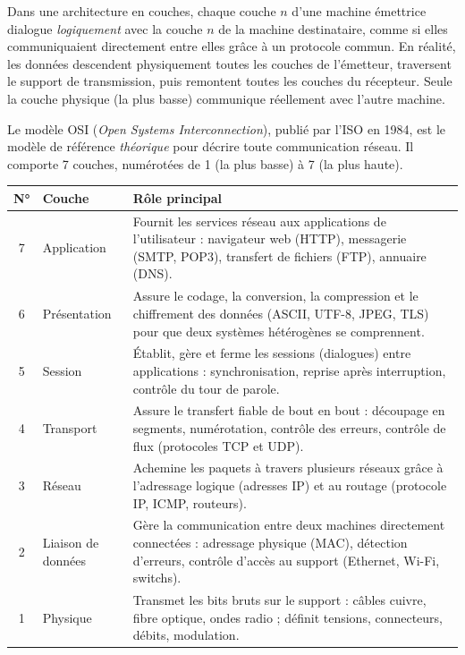 \documentclass[11pt]{article}
\newcommand{\cle}[1]{{\popxbold\color{popdark}#1}}
\newcounter{popsec}
\newcounter{popsub}
\newcommand{\courssub}[1]{%
  \stepcounter{popsub}%
  \par\vspace{9pt}\noindent{\popxbold\fontsize{11.5}{13}\selectfont\color{popink}{\color{poporange}\thepopsec.\thepopsub}\hspace{6pt}#1}\par\nopagebreak\vspace{4pt}
}
\begin{document}
\begin{propriete}
Dans une architecture en couches, chaque couche $n$ d'une machine émettrice dialogue \emph{logiquement} avec la couche $n$ de la machine destinataire, comme si elles communiquaient directement entre elles grâce à un protocole commun. En réalité, les données descendent physiquement toutes les couches de l'émetteur, traversent le support de transmission, puis remontent toutes les couches du récepteur. Seule la couche physique (la plus basse) communique réellement avec l'autre machine.
\end{propriete}

\courssub{Le modèle OSI : les 7 couches}

Le modèle \cle{OSI} (\emph{Open Systems Interconnection}), publié par l'\cle{ISO} en 1984, est le modèle de référence \emph{théorique} pour décrire toute communication réseau. Il comporte 7 couches, numérotées de 1 (la plus basse) à 7 (la plus haute).

\begin{center}
\begin{tabularx}{\linewidth}{|c|l|X|}
\hline
\rowcolor{popblueL} \textbf{N°} & \textbf{Couche} & \textbf{Rôle principal} \\
\hline
7 & Application & Fournit les services réseau aux applications de l'utilisateur : navigateur web (HTTP), messagerie (SMTP, POP3), transfert de fichiers (FTP), annuaire (DNS). \\
\hline
6 & Présentation & Assure le codage, la conversion, la compression et le chiffrement des données (ASCII, UTF-8, JPEG, TLS) pour que deux systèmes hétérogènes se comprennent. \\
\hline
5 & Session & Établit, gère et ferme les sessions (dialogues) entre applications : synchronisation, reprise après interruption, contrôle du tour de parole. \\
\hline
4 & Transport & Assure le transfert fiable de bout en bout : découpage en segments, numérotation, contrôle des erreurs, contrôle de flux (protocoles TCP et UDP). \\
\hline
3 & Réseau & Achemine les paquets à travers plusieurs réseaux grâce à l'adressage logique (adresses IP) et au routage (protocole IP, ICMP, routeurs). \\
\hline
2 & Liaison de données & Gère la communication entre deux machines directement connectées : adressage physique (MAC), détection d'erreurs, contrôle d'accès au support (Ethernet, Wi-Fi, switchs). \\
\hline
1 & Physique & Transmet les bits bruts sur le support : câbles cuivre, fibre optique, ondes radio ; définit tensions, connecteurs, débits, modulation. \\
\hline
\end{tabularx}
\end{center}
\end{document}
